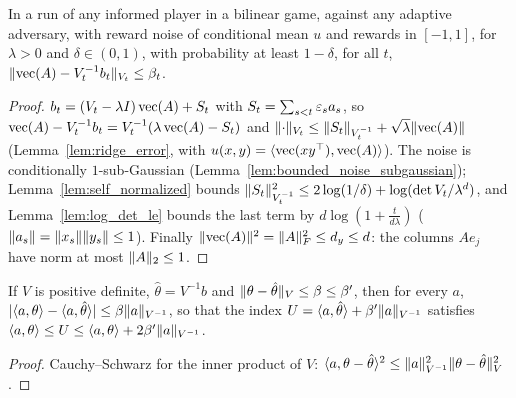 \begin{lemma}
  \label{lem:conf_ellipsoid}
  \leanok
  In a run of any informed player in a bilinear game, against any adaptive adversary, with reward
  noise of conditional mean $u$ and rewards in $[-1, 1]$, for $\lambda > 0$ and $\delta \in (0, 1)$,
  with probability at least $1 - \delta$, for all $t$, $\lVert \operatorname{vec}(A) - V_t^{-1} b_t \rVert_{V_t} \le
  \beta_t$.
\end{lemma}

\begin{proof}
  \leanok
  $b_t = (V_t - \lambda I)\operatorname{vec}(A) + S_t$ with $S_t = \sum_{s < t} \varepsilon_s a_s$, so
  $\operatorname{vec}(A) - V_t^{-1} b_t = V_t^{-1}(\lambda \operatorname{vec}(A) - S_t)$ and
  $\lVert \cdot \rVert_{V_t} \le \lVert S_t \rVert_{V_t^{-1}} + \sqrt\lambda \lVert \operatorname{vec}(A) \rVert$
  (Lemma~\ref{lem:ridge_error}, with $u(x, y) = \langle \operatorname{vec}(x y^\top), \operatorname{vec}(A)\rangle$). The
  noise is conditionally $1$-sub-Gaussian (Lemma~\ref{lem:bounded_noise_subgaussian});
  Lemma~\ref{lem:self_normalized} bounds
  $\lVert S_t \rVert_{V_t^{-1}}^2 \le 2 \log(1/\delta) + \log(\det V_t/\lambda^d)$, and
  Lemma~\ref{lem:log_det_le} bounds the last term by $d \log(1 + \frac{t}{d\lambda})$ ($\lVert a_s \rVert
  = \lVert x_s \rVert\lVert y_s \rVert \le 1$). Finally $\lVert \operatorname{vec}(A) \rVert^2 = \lVert A \rVert_F^2 \le d_y \le d$: the
  columns $A e_j$ have norm at most $\lVert A \rVert_2 \le 1$.
\end{proof}

\begin{lemma}
  \label{lem:linucb_optimism}
  \leanok
  If $V$ is positive definite, $\hat\theta = V^{-1} b$ and $\lVert \theta - \hat\theta \rVert_V \le \beta \le
  \beta'$, then for every $a$, $\lvert \langle a, \theta\rangle - \langle a, \hat\theta\rangle \rvert \le \beta
  \lVert a \rVert_{V^{-1}}$, so that the index $U = \langle a, \hat\theta\rangle + \beta' \lVert a \rVert_{V^{-1}}$
  satisfies $\langle a, \theta\rangle \le U \le \langle a, \theta\rangle + 2 \beta' \lVert a \rVert_{V^{-1}}$.
\end{lemma}

\begin{proof}
  \leanok
  Cauchy--Schwarz for the inner product of $V$:
  $\langle a, \theta - \hat\theta\rangle^2 \le \lVert a \rVert^2_{V^{-1}} \lVert \theta - \hat\theta \rVert^2_V$.
\end{proof}

